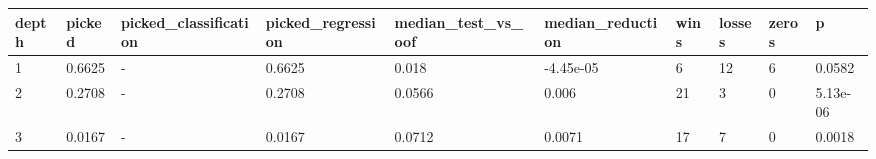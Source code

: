 \begin{tabular}{llllllllll}
\toprule
depth & picked & picked\_classification & picked\_regression & median\_test\_vs\_oof & median\_reduction & wins & losses & zeros & p \\
\midrule
1 & 0.6625 & - & 0.6625 & 0.018 & -4.45e-05 & 6 & 12 & 6 & 0.0582 \\
2 & 0.2708 & - & 0.2708 & 0.0566 & 0.006 & 21 & 3 & 0 & 5.13e-06 \\
3 & 0.0167 & - & 0.0167 & 0.0712 & 0.0071 & 17 & 7 & 0 & 0.0018 \\
\bottomrule
\end{tabular}
